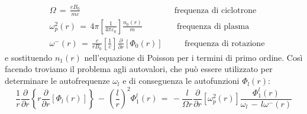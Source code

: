 \begin{align}
    & \Omega\,=\,\frac{eB_0}{mc} \qquad \qquad \qquad \qquad \qquad \,\,\,\,\,\,\,\, \text{frequenza di ciclotrone}\\
    & \omega_p^2\left(r\right)\,=\,4\pi\left[\frac{1}{4\pi\varepsilon_0}\right]\frac{n_0\left(r\right)}{m} \, \qquad \qquad \text{frequenza di plasma} \\
    & \omega^-\left(r\right)\,=\,\frac{c}{rB_0}\left[\frac{1}{c}\right]\frac{\partial}{\partial r}\left[\Phi_0\left(r\right)\right] \qquad \,\,\,\, \text{frequenza di rotazione}
\end{align}
e sostituendo $n_1\left(r\right)$ nell'equazione di Poisson per i termini di primo ordine.
Così facendo troviamo il problema agli autovalori, che può essere utilizzato per determinare le autofrequenze $\omega_l$ e di conseguenza 
le autofunzioni $\Phi_l\left(r\right)$:
\begin{equation}
    \frac{1}{r}\frac{\partial}{\partial r}\left\{r\frac{\partial}{\partial r}\left[\Phi_l\left(r\right)\right]\right\}\,-\,\left(\frac{l}{r}\right)^2\Phi_1^l\left(r\right)\,=\,-\frac{l}{\Omega r}\frac{\partial}{\partial r}\left[\omega_p^2\left(r\right)\right]\frac{\Phi_1^l\left(r\right)}{\omega_l\,-\,l\omega^-\left(r\right)}
    \label{equation: problema_autovalori}
\end{equation}
